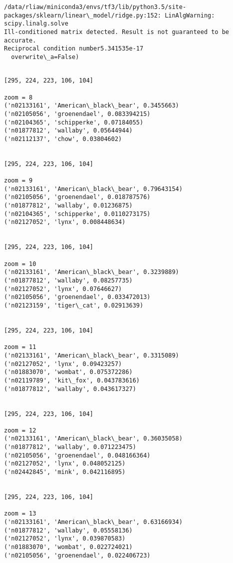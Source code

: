 \documentclass[11pt]{article}
\begin{document}
    \begin{Verbatim}[commandchars=\\\{\}]
/data/rliaw/miniconda3/envs/tf3/lib/python3.5/site-packages/sklearn/linear\_model/ridge.py:152: LinAlgWarning: scipy.linalg.solve
Ill-conditioned matrix detected. Result is not guaranteed to be accurate.
Reciprocal condition number5.341535e-17
  overwrite\_a=False)

    \end{Verbatim}

    \begin{Verbatim}[commandchars=\\\{\}]

[295, 224, 223, 106, 104]

zoom = 8
('n02133161', 'American\_black\_bear', 0.3455663)
('n02105056', 'groenendael', 0.083394215)
('n02104365', 'schipperke', 0.07184055)
('n01877812', 'wallaby', 0.05644944)
('n02112137', 'chow', 0.03804602)


[295, 224, 223, 106, 104]

zoom = 9
('n02133161', 'American\_black\_bear', 0.79643154)
('n02105056', 'groenendael', 0.018787576)
('n01877812', 'wallaby', 0.01236875)
('n02104365', 'schipperke', 0.0110273175)
('n02127052', 'lynx', 0.008448634)


[295, 224, 223, 106, 104]

zoom = 10
('n02133161', 'American\_black\_bear', 0.3239889)
('n01877812', 'wallaby', 0.08257735)
('n02127052', 'lynx', 0.07646627)
('n02105056', 'groenendael', 0.033472013)
('n02123159', 'tiger\_cat', 0.02913639)


[295, 224, 223, 106, 104]

zoom = 11
('n02133161', 'American\_black\_bear', 0.3315089)
('n02127052', 'lynx', 0.09423257)
('n01883070', 'wombat', 0.075372286)
('n02119789', 'kit\_fox', 0.043783616)
('n01877812', 'wallaby', 0.043617327)


[295, 224, 223, 106, 104]

zoom = 12
('n02133161', 'American\_black\_bear', 0.36035058)
('n01877812', 'wallaby', 0.071223475)
('n02105056', 'groenendael', 0.048166364)
('n02127052', 'lynx', 0.048052125)
('n02442845', 'mink', 0.042116895)


[295, 224, 223, 106, 104]

zoom = 13
('n02133161', 'American\_black\_bear', 0.63166934)
('n01877812', 'wallaby', 0.05558136)
('n02127052', 'lynx', 0.039870583)
('n01883070', 'wombat', 0.022724021)
('n02105056', 'groenendael', 0.022406723)


    \end{Verbatim}
\end{document}
